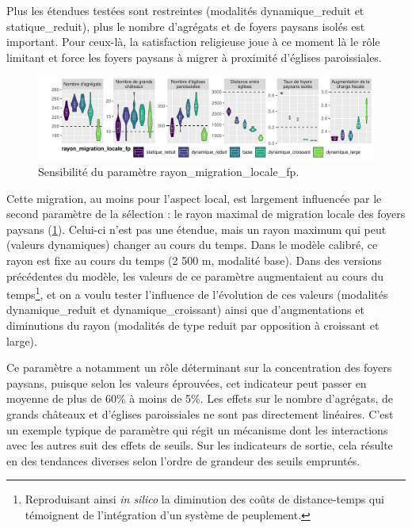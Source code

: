 Plus les étendues testées sont restreintes (modalités \og dynamique\_reduit\fg{} et \og statique\_reduit\fg{}), plus le nombre d'agrégats et de foyers paysans isolés est important.
Pour ceux-là, la satisfaction religieuse joue à ce moment là le rôle limitant et \og force\fg{} les foyers paysans à migrer à proximité d'églises paroissiales.

\begin{figure}[H]
	\centering
	\includegraphics[width=\linewidth]{img/sensib/sensibilite_rayon_migration_locale_fp.pdf}
	\caption{Sensibilité du paramètre \textsf{rayon\_migration\_locale\_fp}.}
	\label{fig:sensib-fp-2}
\end{figure}

Cette migration, au moins pour l'aspect local, est largement influencée par le second paramètre de la sélection : le rayon maximal de migration locale des foyers paysans (\cref{fig:sensib-fp-2}). 
Celui-ci n'est pas une étendue, mais un rayon maximum qui peut (valeurs \og dynamiques\fg{}) changer au cours du temps.
Dans le modèle calibré, ce rayon est fixe au cours du temps (2 500 m, modalité \og base\fg{}).
Dans des versions précédentes du modèle, les valeurs de ce paramètre augmentaient au cours du temps\footnote{
	Reproduisant ainsi \textit{in silico} la diminution des coûts de distance-temps qui témoignent de l'intégration d'un système de peuplement.
}, et on a voulu tester l'influence de l'évolution de ces valeurs (modalités \og dynamique\_reduit\fg{} et \og dynamique\_croissant\fg{}) ainsi que d'augmentations et diminutions du rayon (modalités de type \og reduit\fg{} par opposition à \og croissant\fg{} et \og large\fg{}).

Ce paramètre a notamment un rôle déterminant sur la concentration des foyers paysans, puisque selon les valeurs éprouvées, cet indicateur peut passer en moyenne de plus de 60\% à moins de 5\%.
Les effets sur le nombre d'agrégats, de grands châteaux et d'églises paroissiales ne sont pas directement linéaires.
C'est un exemple typique de paramètre qui régit un mécanisme dont les interactions avec les autres suit des effets de seuils.
Sur les indicateurs de sortie, cela résulte en des tendances diverses selon l'ordre de grandeur des seuils empruntés.

